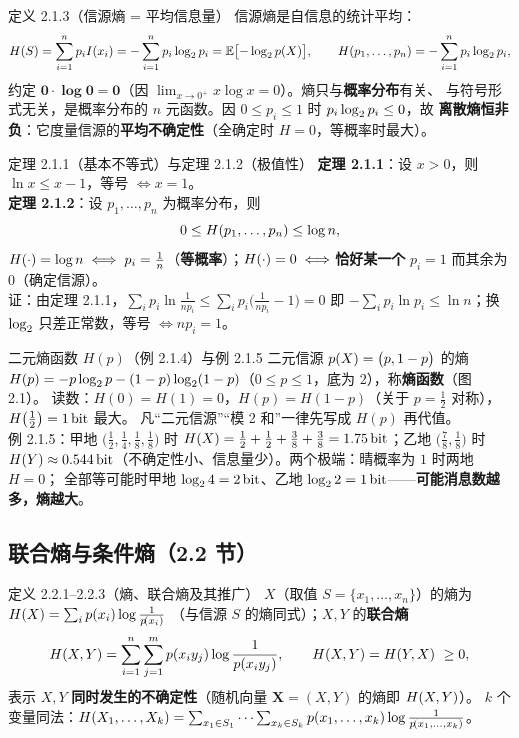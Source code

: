 \begin{defbox}{定义 2.1.3（信源熵 = 平均信息量）}
信源熵是自信息的统计平均：
\[
H\!\left(S\right)=\sum_{i=1}^{n}p_iI\!\left(x_i\right)=-\sum_{i=1}^{n}p_i\log_{2} p_i=\operatorname{\mathbb{E}}\bigl[-\log_{2}p\!\left(X\right)\bigr],
\qquad H\!\left(p_1,\dots,p_n\right)=-\sum_{i=1}^{n}p_i\log_{2} p_i ,
\]
约定 $\mathbf{0\cdot\log 0=0}$（因 $\lim_{x\to0^+}x\log x=0$）。熵只与\textbf{概率分布}有关、
与符号形式无关，是概率分布的 $n$ 元函数。因 $0\le p_i\le1$ 时 $p_i\log_{2} p_i\le0$，故
\textbf{离散熵恒非负}：它度量信源的\textbf{平均不确定性}（全确定时 $H=0$，等概率时最大）。
\end{defbox}

\begin{thmbox}{定理 2.1.1（基本不等式）与定理 2.1.2（极值性）}
\textbf{定理 2.1.1}：设 $x>0$，则 $\ln x\le x-1$，等号 $\iff x=1$。\\[2pt]
\textbf{定理 2.1.2}：设 $p_1,\dots,p_n$ 为概率分布，则
\[
0\le H\!\left(p_1,\dots,p_n\right)\le\log n ,
\]
$H\!\left(\cdot\right)=\log n\iff p_i=\frac1n$（\textbf{等概率}）；$H\!\left(\cdot\right)=0\iff$\textbf{恰好某一个}
$p_i=1$ 而其余为 $0$（确定信源）。\\
证：由定理 2.1.1，$\sum_i p_i\ln\frac{1}{np_i}\le\sum_i p_i\bigl(\frac{1}{np_i}-1\bigr)=0$
即 $-\sum_i p_i\ln p_i\le\ln n$；换 $\log_{2}$ 只差正常数，等号 $\iff np_i=1$。
\end{thmbox}

\begin{defbox}{二元熵函数 $H(p)$（例 2.1.4）与例 2.1.5}
二元信源 $p\!\left(X\right)=\bigl(p,1-p\bigr)$ 的熵
$H\!\left(p\right)=-p\log_{2} p-(1-p)\log_{2}(1-p)$（$0\le p\le1$，底为 $2$），称\textbf{熵函数}（图 2.1）。
读数：$H(0)=H(1)=0$，$H(p)=H(1-p)$（关于 $p=\frac12$ 对称），$H\bigl(\frac12\bigr)=1\,\text{bit}$ 最大。
凡“二元信源”“模 2 和”一律先写成 $H(p)$ 再代值。\\[2pt]
例 2.1.5：甲地 $\bigl(\tfrac12,\tfrac14,\tfrac18,\tfrac18\bigr)$ 时
$H\!\left(X\right)=\frac12+\frac12+\frac38+\frac38=1.75\,\text{bit}$；乙地 $\bigl(\tfrac78,\tfrac18\bigr)$ 时
$H\!\left(Y\right)\approx0.544\,\text{bit}$（不确定性小、信息量少）。两个极端：晴概率为 $1$ 时两地 $H=0$；
全部等可能时甲地 $\log_{2}4=2\,\text{bit}$、乙地 $\log_{2}2=1\,\text{bit}$——\textbf{可能消息数越多，熵越大}。
\end{defbox}

\subsection{联合熵与条件熵（2.2 节）}

\begin{defbox}{定义 2.2.1--2.2.3（熵、联合熵及其推广）}
$X$（取值 $S=\{x_1,\dots,x_n\}$）的熵为 $H\!\left(X\right)=\sum_ip\!\left(x_i\right)\log\frac{1}{p\!\left(x_i\right)}$
（与信源 $S$ 的熵同式）；$X,Y$ 的\textbf{联合熵}
\[
H\!\left(X,Y\right)=\sum_{i=1}^{n}\sum_{j=1}^{m}p\!\left(x_iy_j\right)\log\frac{1}{p\!\left(x_iy_j\right)},
\qquad H\!\left(X,Y\right)=H\!\left(Y,X\right)\ \ge 0 ,
\]
表示 $X,Y$ \textbf{同时发生的不确定性}（随机向量 $\mathbf{X}=(X,Y)$ 的熵即 $H\!\left(X,Y\right)$）。
$k$ 个变量同法：$H\!\left(X_1,\dots,X_k\right)=\sum_{x_1\in S_1}\cdots\sum_{x_k\in S_k}
p\!\left(x_1,\dots,x_k\right)\log\frac{1}{p\!\left(x_1,\dots,x_k\right)}$。
\end{defbox}

